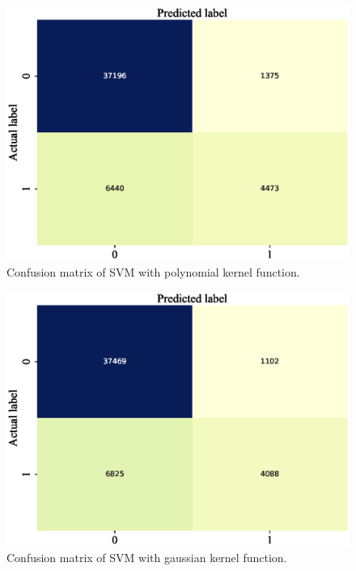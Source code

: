 \documentclass[11pt, a4paper, jou]{apa7}
\begin{document}
\begin{figure}[h]
    \centering
    \caption{Confusion matrix of SVM with polynomial kernel function. }\label{fig:SVM_poly_confusion}
    \includegraphics[width=.45\textwidth]{figures/SVM_poly_confusion_matrix.eps}
\end{figure}

\begin{figure}[h]
    \centering
    \caption{Confusion matrix of SVM with gaussian kernel function. }\label{fig:SVM_gauss_confusion}
    \includegraphics[width=.45\textwidth]{figures/SVM_gauss_confusion_matrix.eps}
\end{figure}

\begin{table}[h]
    \centering
    \caption{Classification results of logistic regression models on the test set. }
    \label{tab:logistic_summary}
\end{table}
\end{document}

